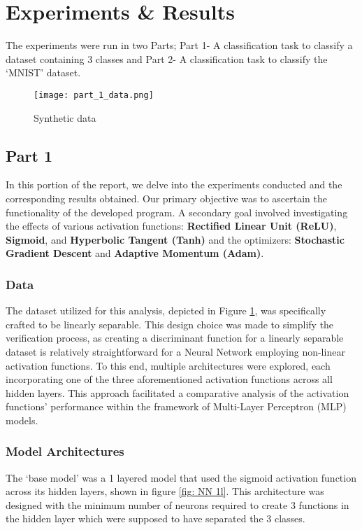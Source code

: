 \section{Experiments \& Results}

The experiments were run in two Parts; Part 1- A classification task to classify a dataset containing 3 classes and 
Part 2- A classification task to classify the `MNIST' dataset.

\begin{figure}
    \centering
    \texttt{[image: part\_1\_data.png]}
    \caption[short]{Synthetic data}
    \label{fig: Synthetic data}
\end{figure}

\subsection{Part 1}

In this portion of the report, we delve into the experiments conducted and the
corresponding results obtained. Our primary objective was to ascertain the 
functionality of the developed program. A secondary goal involved investigating 
the effects of various activation functions: \textbf{Rectified Linear Unit (ReLU)}, 
\textbf{Sigmoid}, and \textbf{Hyperbolic Tangent (Tanh)} and the optimizers: 
\textbf{Stochastic Gradient Descent} and \textbf{Adaptive Momentum (Adam)}. 

\subsubsection{Data}
The dataset utilized for 
this analysis, depicted in Figure \ref{fig: Synthetic data}, was specifically 
crafted to be linearly separable. This design choice was made to simplify the 
verification process, as creating a discriminant function for a linearly 
separable dataset is relatively straightforward for a Neural Network employing 
non-linear activation functions. To this end, multiple architectures were 
explored, each incorporating one of the three aforementioned activation 
functions across all hidden layers. This approach facilitated a comparative 
analysis of the activation functions' performance within the framework of 
Multi-Layer Perceptron (MLP) models. 

\subsubsection{Model Architectures}
The `base model' was a 1 layered model that used the sigmoid activation function
across its hidden layers, shown in figure \ref{fig: NN 1l}. This architecture was 
designed with the minimum number of neurons required to create 3 functions in the
hidden layer which were supposed to have separated the 3 classes.

